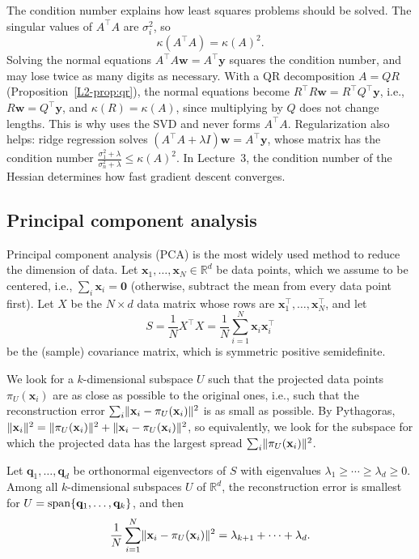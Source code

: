 The condition number explains how least squares problems should be solved. The singular values of $A^\top A$ are $\sigma_i^2$, so
\[\kappa(A^\top A) = \kappa(A)^2.\]
Solving the normal equations $A^\top A\mathbf{w} = A^\top\mathbf{y}$ squares the condition number, and may lose twice as many digits as necessary. With a QR decomposition $A = QR$ (Proposition~\ref{L2-prop:qr}), the normal equations become $R^\top R\mathbf{w} = R^\top Q^\top\mathbf{y}$, i.e., $R\mathbf{w} = Q^\top\mathbf{y}$, and $\kappa(R) = \kappa(A)$, since multiplying by $Q$ does not change lengths. This is why  uses the SVD and never forms $A^\top A$. Regularization also helps: ridge regression solves $(A^\top A + \lambda I)\mathbf{w} = A^\top\mathbf{y}$, whose matrix has the condition number $\frac{\sigma_1^2 + \lambda}{\sigma_n^2 + \lambda} \leq \kappa(A)^2$. In Lecture~3, the condition number of the Hessian determines how fast gradient descent converges.

\subsection{Principal component analysis}\label{L2-sec:pca}

Principal component analysis (PCA) is the most widely used method to reduce the dimension of data. Let $\mathbf{x}_1, \ldots, \mathbf{x}_N \in \mathbb{R}^d$ be data points, which we assume to be centered, i.e., $\sum_i \mathbf{x}_i = \mathbf{0}$ (otherwise, subtract the mean from every data point first). Let $X$ be the $N \times d$ data matrix whose rows are $\mathbf{x}_1^\top, \ldots, \mathbf{x}_N^\top$, and let
\[S = \frac{1}{N} X^\top X = \frac{1}{N} \sum_{i=1}^N \mathbf{x}_i \mathbf{x}_i^\top\]
be the (sample) covariance matrix, which is symmetric positive semidefinite.

We look for a $k$-dimensional subspace $U$ such that the projected data points $\pi_U(\mathbf{x}_i)$ are as close as possible to the original ones, i.e., such that the reconstruction error $\sum_i \lVert \mathbf{x}_i - \pi_U(\mathbf{x}_i) \rVert^2$ is as small as possible. By Pythagoras, $\lVert \mathbf{x}_i \rVert^2 = \lVert \pi_U(\mathbf{x}_i) \rVert^2 + \lVert \mathbf{x}_i - \pi_U(\mathbf{x}_i) \rVert^2$, so equivalently, we look for the subspace for which the projected data has the largest spread $\sum_i \lVert \pi_U(\mathbf{x}_i) \rVert^2$.

\begin{theorem}[PCA]\label{L2-thm:pca}
    Let $\mathbf{q}_1, \ldots, \mathbf{q}_d$ be orthonormal eigenvectors of $S$ with eigenvalues $\lambda_1 \geq \cdots \geq \lambda_d \geq 0$. Among all $k$-dimensional subspaces $U$ of $\mathbb{R}^d$, the reconstruction error is smallest for $U = \operatorname{span}\{\mathbf{q}_1, \ldots, \mathbf{q}_k\}$, and then
    \[\frac{1}{N}\sum_{i=1}^N \lVert \mathbf{x}_i - \pi_U(\mathbf{x}_i) \rVert^2 = \lambda_{k+1} + \cdots + \lambda_d.\]
\end{theorem}

